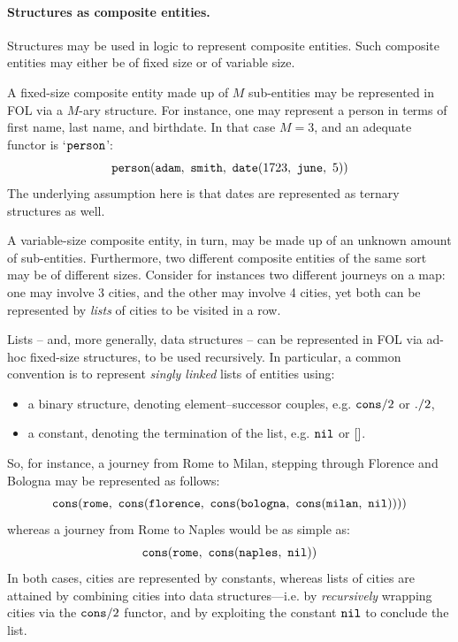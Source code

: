\documentclass[12pt,a4paper,openright,twoside]{book}
\begin{document}
\paragraph{Structures as composite entities.}

Structures may be used in logic to represent composite entities.
%
Such composite entities may either be of fixed size or of variable size.

A fixed-size composite entity made up of $M$ sub-entities may be represented in FOL via a $M$-ary structure.
%
For instance, one may represent a person in terms of first name, last name, and birthdate.
%
In that case $M = 3$, and an adequate functor is `$\mathtt{person}$':
%
$$
\functor{person}(\functor{adam},\ \functor{smith},\ \functor{date}(1723,\ \functor{june},\ 5))
$$ 
%
The underlying assumption here is that dates are represented as ternary structures as well.

A variable-size composite entity, in turn, may be made up of an unknown amount of sub-entities.
%
Furthermore, two different composite entities of the same sort may be of different sizes.
%
Consider for instances two different journeys on a map: one may involve 3 cities, and the other may involve 4 cities, yet both can be represented by \emph{lists} of cities to be visited in a row.

Lists -- and, more generally, data structures -- can be represented in FOL via ad-hoc fixed-size structures, to be used recursively.
%
In particular, a common convention is to represent \emph{singly linked} lists of entities using:
%
\begin{itemize}
    \item a binary structure, denoting element--successor couples, e.g. $\mathtt{cons}/2$ or $\mathtt{.}/2$, 
    \item a constant, denoting the termination of the list, e.g. $\mathtt{nil}$ or $\mathtt{[]}$.
\end{itemize}
%
So, for instance, a journey from Rome to Milan, stepping through Florence and Bologna may be represented as follows:
%
\begin{equation}\label{eq:path-rome-milan}
    \functor{cons}(\functor{rome},\ 
        \functor{cons}(\functor{florence},\ 
            \functor{cons}(\functor{bologna},\ 
                \functor{cons}(\functor{milan},\ 
                    \functor{nil}
                )
            )
        )
    )
\end{equation}
%
whereas a journey from Rome to Naples would be as simple as:
%
\begin{equation*}
    \functor{cons}(\functor{rome},\ 
        \functor{cons}(\functor{naples},\ 
            \functor{nil}
        )
    )
\end{equation*}
%
In both cases, cities are represented by constants, whereas lists of cities are attained by combining cities into data structures---i.e. by \emph{recursively} wrapping cities via the $\mathtt{cons}/2$ functor, and by exploiting the constant $\mathtt{nil}$ to conclude the list.
\end{document}
